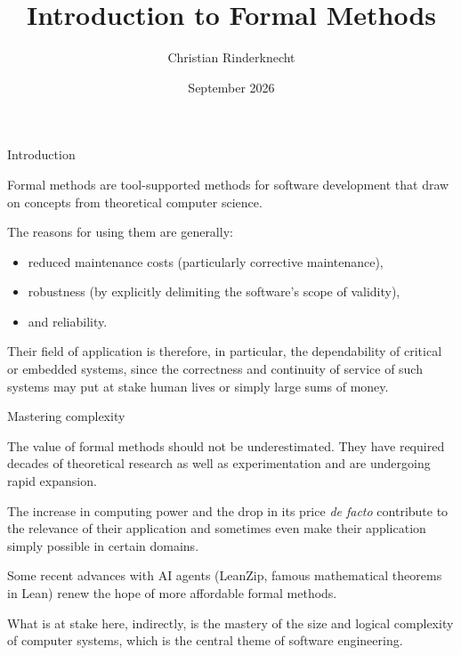 \documentclass[compress,dvips,xcolor={dvipsnames},t]{beamer}
\title{\LARGE Introduction to Formal Methods}
\author{\Large Christian Rinderknecht}
\institute{\normalsize Eszterházy Károly Katolikus Egyetem}
\date{September 2026}
\begin{document}
\frame{\maketitle}

%
\begin{frame}{Introduction}

  Formal methods are tool-supported methods for software development
  that draw on concepts from theoretical computer science.

  \bigskip

  The reasons for using them are generally:
  \begin{itemize}

    \item reduced maintenance costs (particularly corrective
      maintenance),

    \item robustness (by explicitly delimiting the software's scope of
      validity),

    \item and reliability.

  \end{itemize}

  \bigskip

  Their field of application is therefore, in particular, the
  dependability of critical or embedded systems, since the correctness
  and continuity of service of such systems may put at stake human
  lives or simply large sums of money.

\end{frame}

%
\begin{frame}{Mastering complexity}

  The value of formal methods should not be underestimated.  They have
  required decades of theoretical research as well as experimentation
  and are undergoing rapid expansion.

  \bigskip

  The increase in computing power and the drop in its price \emph{de
  facto} contribute to the relevance of their application and
  sometimes even make their application simply possible in certain
  domains.

  \bigskip

  Some recent advances with AI agents (LeanZip, famous mathematical
  theorems in Lean) renew the hope of more affordable formal methods.

  \bigskip

  What is at stake here, indirectly, is the mastery of the size and
  logical complexity of computer systems, which is the central theme
  of software engineering.

\end{frame}
\end{document}
